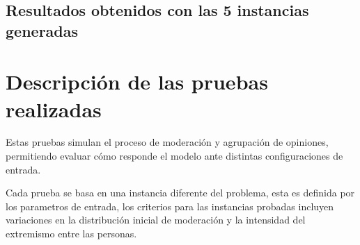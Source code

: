 \documentclass[11pt,letter]{article}
\begin{document}
\subsection{Resultados obtenidos con las 5 instancias generadas}
\begin{table}[H]
    \centering
    \small
    \caption{Tabla de resultados obtenidos por el modelo implementado en MiniZinc a lo largo de las intancias creadas.}
\end{table}

\section{Descripción de las pruebas realizadas}
Estas pruebas simulan el proceso de moderación y agrupación de opiniones, permitiendo evaluar cómo responde el modelo ante distintas configuraciones de entrada.

Cada prueba se basa en una instancia diferente del problema, esta es definida por los parametros de entrada, los criterios para las instancias probadas incluyen variaciones en la distribución inicial de moderación y la intensidad del extremismo entre las personas.
\end{document}
